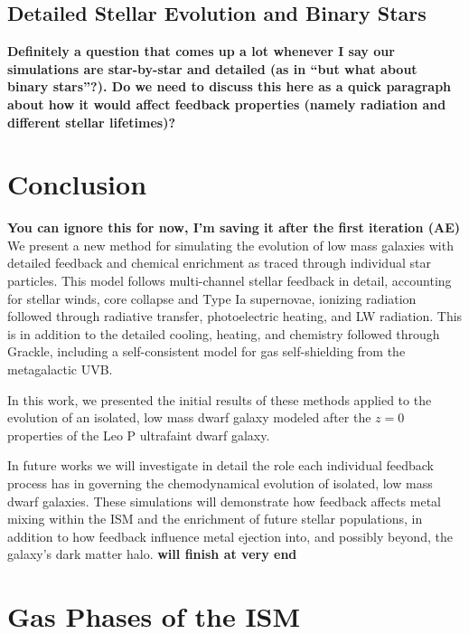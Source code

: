 \documentclass[twocolumn]{aastex61}
\begin{document}
\subsection{Detailed Stellar Evolution and Binary Stars}
\textbf{Definitely a question that comes up a lot whenever I say our simulations are star-by-star and detailed (as in ``but what about binary stars''?). Do we need to discuss this here as a quick paragraph about how it would affect feedback properties (namely radiation and different stellar lifetimes)?} \citep{Ma2016-binary}

\section{Conclusion}
\textbf{You can ignore this for now, I'm saving it after the first iteration (AE)}
We present a new method for simulating the evolution of low mass galaxies with detailed feedback and chemical enrichment as traced through individual star particles. This model follows multi-channel stellar feedback in detail, accounting for stellar winds, core collapse and Type Ia supernovae, ionizing radiation followed through radiative transfer, photoelectric heating, and LW radiation. This is in addition to the detailed cooling, heating, and chemistry followed through Grackle, including a self-consistent model for gas self-shielding from the metagalactic UVB.

In this work, we presented the initial results of these methods applied to the evolution of an isolated, low mass dwarf galaxy modeled after the $z=0$ properties of the Leo P ultrafaint dwarf galaxy. 

In future works we will investigate in detail the role each individual feedback process has in governing the chemodynamical evolution of isolated, low mass dwarf galaxies. These simulations will demonstrate how feedback affects metal mixing within the ISM and the enrichment of future stellar populations, in addition to how feedback influence metal ejection into, and possibly beyond, the galaxy's dark matter halo. \textbf{will finish at very end}

%
%




\appendix

\section{Gas Phases of the ISM}
\label{appendix:phases}
\end{document}
